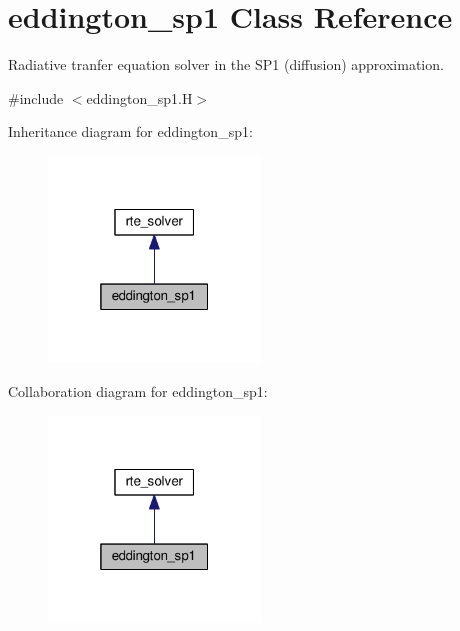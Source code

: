 \hypertarget{classeddington__sp1}{}\section{eddington\+\_\+sp1 Class Reference}
\label{classeddington__sp1}


Radiative tranfer equation solver in the S\+P1 (diffusion) approximation.  




{\ttfamily \#include $<$eddington\+\_\+sp1.\+H$>$}



Inheritance diagram for eddington\+\_\+sp1\+:\nopagebreak
\begin{figure}[H]
\begin{center}
\leavevmode
\includegraphics[width=160pt]{classeddington__sp1__inherit__graph}
\end{center}
\end{figure}


Collaboration diagram for eddington\+\_\+sp1\+:\nopagebreak
\begin{figure}[H]
\begin{center}
\leavevmode
\includegraphics[width=160pt]{classeddington__sp1__coll__graph}
\end{center}
\end{figure}
